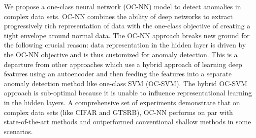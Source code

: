 We propose a one-class neural network (OC-NN) model to detect anomalies in complex data sets. OC-NN
combines the ability of deep networks to extract progressively rich representation of data
with the one-class objective of creating a tight envelope around normal  data. The OC-NN approach
breaks new ground for the following crucial reason:  data representation in the hidden layer is
driven by the OC-NN objective and is thus customized for anomaly detection. This is a departure
from other approaches which use a hybrid approach of learning deep features using an autoencoder
and then feeding the features into a separate anomaly detection method like one-class SVM (OC-SVM).
The hybrid OC-SVM approach is sub-optimal because it is unable to influence representational
learning in the hidden layers. A comprehensive set of experiments demonstrate that on complex data
sets (like CIFAR and GTSRB), OC-NN performs on par with state-of-the-art methods and outperformed conventional shallow methods in some scenarios.

